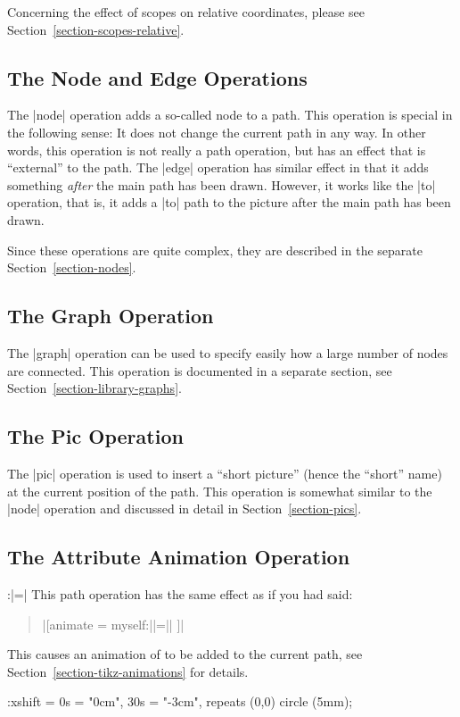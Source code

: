 Concerning the effect of scopes on relative coordinates, please see
Section~\ref{section-scopes-relative}.


\subsection{The Node and Edge Operations}

The |node| operation adds a so-called node to a path. This operation is special
in the following sense: It does not change the current path in any way. In
other words, this operation is not really a path operation, but has an effect
that is ``external'' to the path. The |edge| operation has similar effect in
that it adds something \emph{after} the main path has been drawn. However, it
works like the |to| operation, that is, it adds a |to| path to the picture
after the main path has been drawn.

Since these operations are quite complex, they are described in the separate
Section~\ref{section-nodes}.


\subsection{The Graph Operation}

The |graph| operation can be used to specify easily how a large number of nodes
are connected. This operation is documented in a separate section, see
Section~\ref{section-library-graphs}.


\subsection{The Pic Operation}

The |pic| operation is used to insert a ``short picture'' (hence the ``short''
name) at the current position of the path. This operation is somewhat similar
to the |node| operation and discussed in detail in Section~\ref{section-pics}.


\subsection{The Attribute Animation Operation}

\begin{pathoperation}{:}{|=|}
    This path operation has the same effect as if you had said:
    \begin{quote}
        |[animate = { myself:||=||} ]|
    \end{quote}
    This causes an animation of  to be added to the
    current path, see Section~\ref{section-tikz-animations} for details.
\begin{codeexample}[width=2cm,preamble={\usetikzlibrary{animations}}]
\tikz \draw :xshift = {0s = "0cm", 30s = "-3cm", repeats} (0,0) circle (5mm);
\end{codeexample}
\end{pathoperation}


